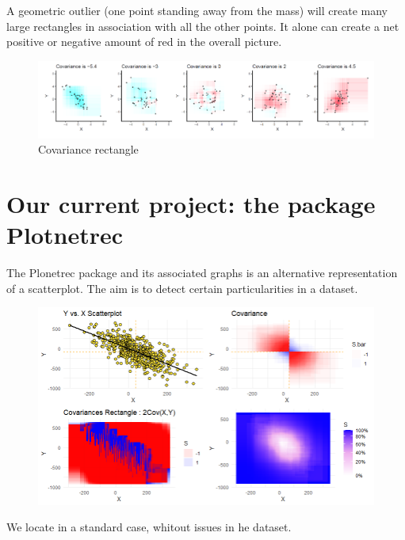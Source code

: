 \documentclass[
]{report}
\begin{document}
A geometric outlier (one point standing away from the mass) will create many large rectangles in association with all the other points. It alone can create a net positive or negative amount of red in the overall picture.

\begin{figure}
    \centering
    \includegraphics{covRect.PNG}
    \caption{Covariance rectangle}
    \label{fig:my_label}
\end{figure}

\hypertarget{our-current-project-the-package-plotnetrec}{%
\section{Our current project: the package Plotnetrec}\label{our-current-project-the-package-plotnetrec}}

The Plonetrec package and its associated graphs is an alternative representation of a scatterplot. The aim is to detect certain particularities in a dataset.

\begin{figure}[H]
\centering
   \includegraphics{all.png}
\end{figure}

We locate in a standard case, whitout issues in he dataset.
\end{document}

